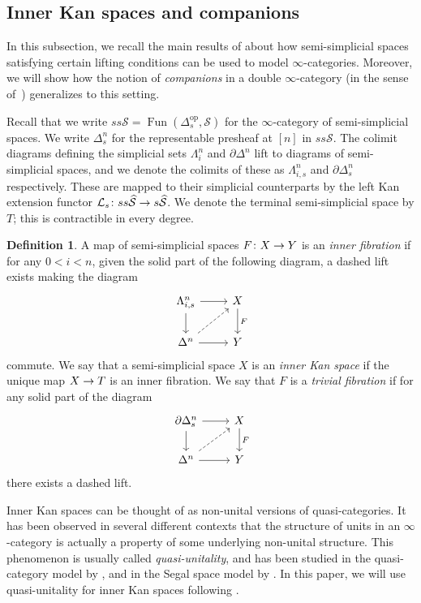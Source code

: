 \documentclass[10pt]{amsart}
\numberwithin{equation}{section}
\theoremstyle{definition}
\newtheorem{definition}[prop]{Definition}
\DeclareMathOperator{\Fun}{Fun}
\DeclareMathOperator{\op}{op}
\newcommand{\Simp}{\mathbb{\Delta}}
\newcommand{\Horn}{\Lambda}
\newcommand{\cS}{\mathcal{S}}
\newcommand{\cL}{\mathcal{L}}
\newcommand{\del}{\partial}
\renewcommand{\to}{\mathchoice{\longrightarrow}{\rightarrow}{}{}}
\begin{document}
	\subsection{Inner Kan spaces and companions}\label{subsec:inner_kan_spaces_and_companions}
	In this subsection, we recall the main results of \cite{oldervoll2026quasi} about how semi-simplicial spaces satisfying certain lifting conditions can be used to model $\infty$-categories.
  Moreover, we will show how the notion of \emph{companions} in a double $\infty$-category (in the sense of~\cite{ruit2025companion}) generalizes to this setting.

	Recall that we write $ss\cS=\Fun(\Simp_{s}^{\op},\cS)$ for the $\infty$-category of semi-simplicial spaces.
  We write $\Delta^{n}_{s}$ for the representable presheaf at $[n]$ in $ss\cS$.
  The colimit diagrams defining the simplicial sets $\Horn^{n}_{i}$ and $\del \Delta^{n}$ lift to diagrams of semi-simplicial spaces, and we denote the colimits of these as $\Horn^{n}_{i,s}$ and $\del \Delta^{n}_{s}$ respectively.
  These are mapped to their simplicial counterparts by the left Kan extension functor $\cL_{s}\colon ss\widehat{\cS} \to s\widehat{\cS}$.
	We denote the terminal semi-simplicial space by $T$; this is contractible in every degree.

	\begin{definition}\label{def:inner_fibration}
		A map of semi-simplicial spaces $F\colon X\to Y$ is an \emph{inner fibration} if for any $0<i<n$, given the solid part of the following diagram, a dashed lift exists making the diagram
		\begin{equation*}
			\begin{tikzcd}
				\Horn^{n}_{i,s} \arrow[r] \arrow[d]      &   X  \arrow[d, "F"] \\
				\Delta^{n}  \arrow[r] \arrow[ur, dashed]              &   Y
			\end{tikzcd}
		\end{equation*}
    commute.
		We say that a semi-simplicial space $X$ is an \emph{inner Kan space} if the unique map $X\to T$ is an inner fibration. We say that $F$ is a \emph{trivial fibration} if for any solid part of the diagram
		\begin{equation*}
			\begin{tikzcd}
				\del \Delta^{n}_{s} \arrow[r] \arrow[d]      &   X  \arrow[d, "F"] \\
				\Delta^{n}  \arrow[r] \arrow[ur, dashed]              &   Y
			\end{tikzcd}
		\end{equation*}
		there exists a dashed lift.
	\end{definition}
	Inner Kan spaces can be thought of as non-unital versions of quasi-categories. It has been observed in several different contexts that the structure of units in an $\infty$-category is actually a property of some underlying non-unital structure. This phenomenon is usually called \emph{quasi-unitality}, and has been studied in the quasi-category model by \cite{henry2018weak,steimle2018degeneracies,tanaka2018functors}, and in the Segal space model by \cite{harpaz2015quasi,haugseng2021segal}. In this paper, we will use quasi-unitality for inner Kan spaces following \cite{oldervoll2026quasi}.
\end{document}
